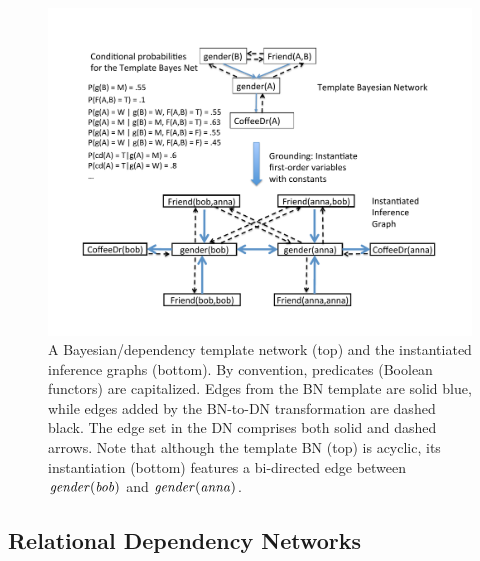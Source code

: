 \documentclass[runningheads,a4paper]{llncs}
\begin{document}
\begin{figure}[htbp]
\begin{center}
\includegraphics[width = 0.7 \textwidth]{dn.pdf}
\caption{A Bayesian/dependency template network (top) and the instantiated inference graphs (bottom). By convention, predicates (Boolean functors) are capitalized. Edges from the BN template are solid blue, while edges added by the BN-to-DN transformation are dashed black. The edge set in the DN comprises both solid and dashed arrows. Note that although the template BN (top) is acyclic, its  instantiation (bottom) features a bi-directed edge between $\it{gender}(bob)$ and $\it{gender}(anna)$. \label{fig:dn}
}
\end{center}
\end{figure} 
\subsection{Relational Dependency Networks}\label{sec:rdns}
\end{document}
